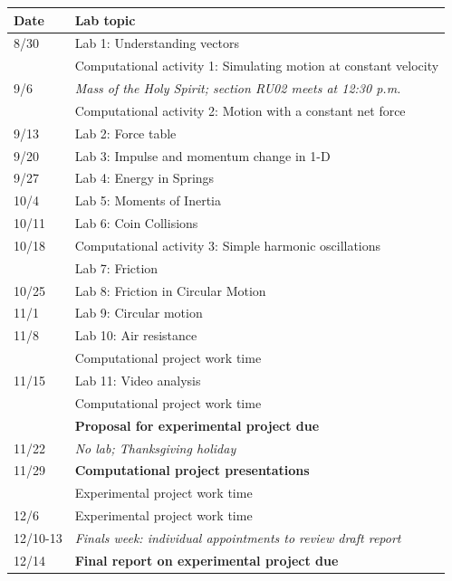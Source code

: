 \documentclass[11pt]{article}
\begin{document}
\begin{center}
\begin{tabular}{|l|l|}
\hline
Date & Lab topic  \\
\hline
8/30 & Lab 1: Understanding vectors \\
     & Computational activity 1: Simulating motion at constant velocity \\
\hline
9/6 & {\em Mass of the Holy Spirit; section RU02 meets at 12:30 p.m.} \\
     & Computational activity 2: Motion with a constant net force \\
\hline
9/13 & Lab 2: Force table \\
\hline
9/20 & Lab 3: Impulse and momentum change in 1-D \\
\hline
9/27 & Lab 4: Energy in Springs \\
\hline
10/4 & Lab 5: Moments of Inertia \\
\hline
10/11 & Lab 6: Coin Collisions \\
\hline
10/18 & Computational activity 3: Simple harmonic oscillations \\
 & Lab 7: Friction \\
\hline
10/25 & Lab 8: Friction in Circular Motion \\
\hline
11/1 & Lab 9: Circular motion \\
\hline
11/8 & Lab 10: Air resistance \\
 & Computational project work time \\
\hline
11/15 & Lab 11: Video analysis \\
 & Computational project work time \\
 & {\textbf {Proposal for experimental project due}} \\
\hline
11/22 & {\em No lab; Thanksgiving holiday} \\
\hline
11/29 & {\textbf {Computational project presentations}} \\
& Experimental project work time \\
\hline
12/6 & Experimental project work time \\
\hline
12/10-13 & {\em{Finals week: individual appointments to review draft report}} \\
12/14 & {\textbf{Final report on experimental project due}} \\
\hline
\end{tabular}
\end{center}
\end{document}
